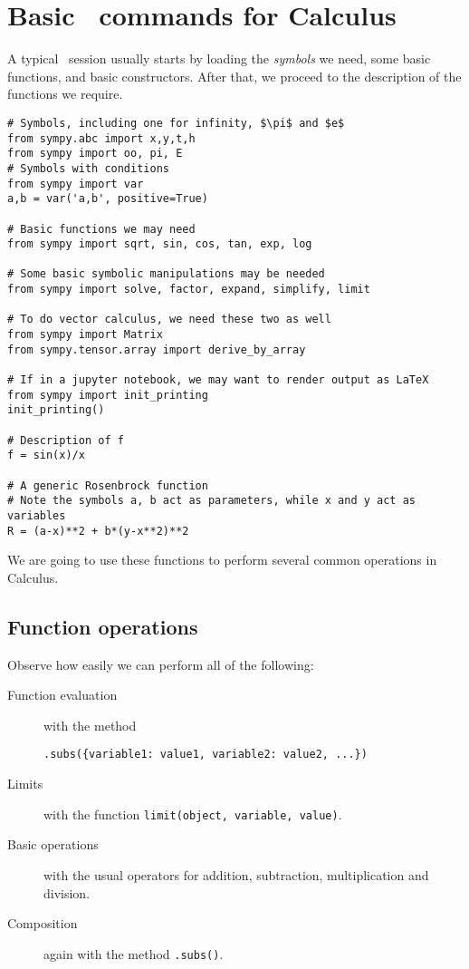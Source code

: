 
\chapter{Basic \sympy\ commands for Calculus}

A typical \sympy\ session usually starts by loading the \emph{symbols} we need, some basic functions, and basic constructors.  After that, we proceed to the description of the functions we require.

\begin{verbatim}
# Symbols, including one for infinity, $\pi$ and $e$
from sympy.abc import x,y,t,h
from sympy import oo, pi, E
# Symbols with conditions
from sympy import var
a,b = var('a,b', positive=True)

# Basic functions we may need
from sympy import sqrt, sin, cos, tan, exp, log

# Some basic symbolic manipulations may be needed
from sympy import solve, factor, expand, simplify, limit

# To do vector calculus, we need these two as well
from sympy import Matrix
from sympy.tensor.array import derive_by_array

# If in a jupyter notebook, we may want to render output as LaTeX
from sympy import init_printing
init_printing()

# Description of f
f = sin(x)/x

# A generic Rosenbrock function
# Note the symbols a, b act as parameters, while x and y act as variables
R = (a-x)**2 + b*(y-x**2)**2
\end{verbatim}

We are going to use these functions to perform several common operations in Calculus.

\section{Function operations}
Observe how easily we can perform all of the following:
\begin{description}
	\item[Function evaluation] with the method 
	\begin{verbatim}.subs({variable1: value1, variable2: value2, ...})\end{verbatim}
	\item[Limits] with the function \texttt{limit(object, variable, value)}.
	\item[Basic operations] with the usual operators for addition, subtraction, multiplication and division.
	\item[Composition] again with the method \texttt{.subs()}.
\end{description}

